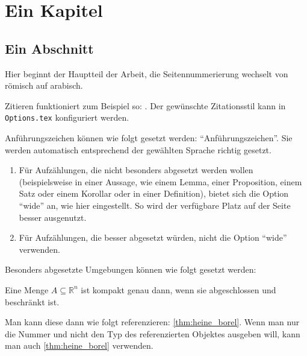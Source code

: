 \chapter{Ein Kapitel}
\section{Ein Abschnitt}

Hier beginnt der Hauptteil der Arbeit, \dh die Seitennummerierung wechselt von römisch auf arabisch. 

Zitieren funktioniert zum Beispiel so: \cite{Amann2008AnalysisII}. Der gewünschte Zitationsstil kann in \texttt{Options.tex}
konfiguriert werden. 

Anführungszeichen können wie folgt gesetzt werden: \enquote{Anführungszeichen}. Sie werden automatisch entsprechend der gewählten Sprache richtig gesetzt.

\begin{enumerate}[wide]
	\item Für Aufzählungen, die nicht besonders abgesetzt werden wollen (beispielsweise in einer Aussage, wie einem Lemma, einer Proposition, einem Satz oder einem Korollar oder in einer Definition), bietet sich die Option
	\enquote{wide} an, wie hier eingestellt. So wird der verfügbare Platz auf der Seite besser ausgenutzt.
	\item Für Aufzählungen, die besser abgesetzt würden, nicht die Option \enquote{wide} verwenden.
\end{enumerate}

Besonders abgesetzte Umgebungen können wie folgt gesetzt werden:

\begin{Theorem}
\label{thm:heine_borel}
	Eine Menge $A\subseteq \mathds{R}^n$ ist kompakt genau dann, wenn sie abgeschlossen und beschränkt ist.
\end{Theorem}
Man kann diese dann wie folgt referenzieren: \cref{thm:heine_borel}. Wenn man nur die Nummer und nicht den Typ des referenzierten Objektes ausgeben will, kann man auch \ref{thm:heine_borel} verwenden.

